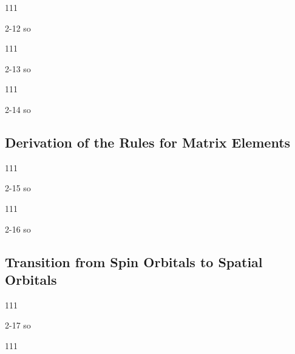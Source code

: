 \documentclass[a4paper]{book}
\begin{document}
	\begin{exercise}
	111
	\end{exercise}
	
	\begin{solution}
		2-12 so
	\end{solution}
	
	\begin{exercise}
	111
	\end{exercise}
	
	\begin{solution}
		2-13 so
	\end{solution}
	
	\begin{exercise}
	111
	\end{exercise}
	
	\begin{solution}
		2-14 so
	\end{solution}
	
	\subsection{Derivation of the Rules for Matrix Elements}
	
	\begin{exercise}
	111
	\end{exercise}
	
	\begin{solution}
		2-15 so
	\end{solution}
	
	\begin{exercise}
	111
	\end{exercise}
	
	\begin{solution}
		2-16 so
	\end{solution}
	
	\subsection{Transition from Spin Orbitals to Spatial Orbitals}
	
	\begin{exercise}
	111
	\end{exercise}
	
	\begin{solution}
		2-17 so
	\end{solution}
	
	\begin{exercise}
	111
	\end{exercise}
	
\end{document}
